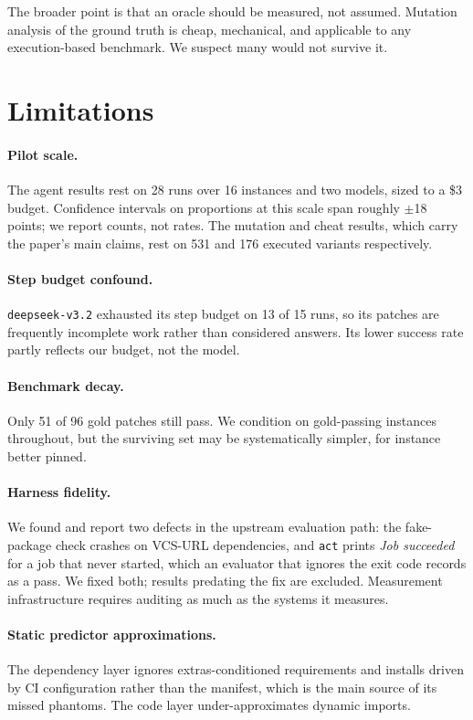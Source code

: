 \documentclass[11pt]{article}
\newcommand{\code}[1]{\texttt{\small #1}}
\begin{document}
The broader point is that an oracle should be measured, not assumed.
Mutation analysis of the ground truth is cheap, mechanical, and applicable to any execution-based benchmark.
We suspect many would not survive it.

\section*{Limitations}
\label{sec:limitations}

\paragraph{Pilot scale.}
The agent results rest on 28 runs over 16 instances and two models, sized to a \$3 budget.
Confidence intervals on proportions at this scale span roughly $\pm$18 points; we report counts, not rates.
The mutation and cheat results, which carry the paper's main claims, rest on 531 and 176 executed variants respectively.

\paragraph{Step budget confound.}
\code{deepseek-v3.2} exhausted its step budget on 13 of 15 runs, so its patches are frequently incomplete work rather than considered answers.
Its lower success rate partly reflects our budget, not the model.

\paragraph{Benchmark decay.}
Only 51 of 96 gold patches still pass.
We condition on gold-passing instances throughout, but the surviving set may be systematically simpler, for instance better pinned.

\paragraph{Harness fidelity.}
We found and report two defects in the upstream evaluation path: the fake-package check crashes on VCS-URL dependencies, and \code{act} prints \emph{Job succeeded} for a job that never started, which an evaluator that ignores the exit code records as a pass.
We fixed both; results predating the fix are excluded.
Measurement infrastructure requires auditing as much as the systems it measures.

\paragraph{Static predictor approximations.}
The dependency layer ignores extras-conditioned requirements and installs driven by CI configuration rather than the manifest, which is the main source of its missed phantoms.
The code layer under-approximates dynamic imports.
\end{document}
